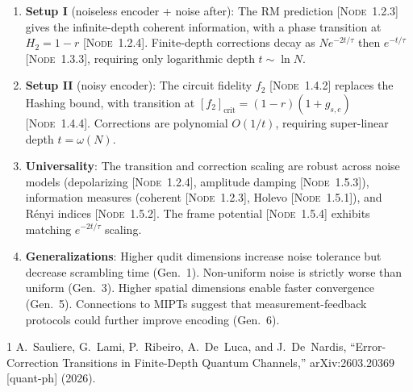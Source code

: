 \documentclass[11pt,a4paper]{article}
\newcommand{\noderef}[1]{\textsc{[Node~#1]}}
\begin{document}
\begin{enumerate}
    \item \textbf{Setup I} (noiseless encoder + noise after): The RM prediction \noderef{1.2.3} gives the infinite-depth coherent information, with a phase transition at $H_2 = 1-r$ \noderef{1.2.4}. Finite-depth corrections decay as $N e^{-2t/\tau}$ then $e^{-t/\tau}$ \noderef{1.3.3}, requiring only logarithmic depth $t \sim \ln N$.

    \item \textbf{Setup II} (noisy encoder): The circuit fidelity $f_2$ \noderef{1.4.2} replaces the Hashing bound, with transition at $[f_2]_{\mathrm{crit}} = (1-r)(1+g_{s,e})$ \noderef{1.4.4}. Corrections are polynomial $O(1/t)$, requiring super-linear depth $t = \omega(N)$.

    \item \textbf{Universality}: The transition and correction scaling are robust across noise models (depolarizing \noderef{1.2.4}, amplitude damping \noderef{1.5.3}), information measures (coherent \noderef{1.2.3}, Holevo \noderef{1.5.1}), and R\'enyi indices \noderef{1.5.2}. The frame potential \noderef{1.5.4} exhibits matching $e^{-2t/\tau}$ scaling.

    \item \textbf{Generalizations}: Higher qudit dimensions increase noise tolerance but decrease scrambling time (Gen.~1). Non-uniform noise is strictly worse than uniform (Gen.~3). Higher spatial dimensions enable faster convergence (Gen.~5). Connections to MIPTs suggest that measurement-feedback protocols could further improve encoding (Gen.~6).
\end{enumerate}

\begin{thebibliography}{1}
A.~Sauliere, G.~Lami, P.~Ribeiro, A.~De~Luca, and J.~De~Nardis,
``Error-Correction Transitions in Finite-Depth Quantum Channels,''
arXiv:2603.20369 [quant-ph] (2026).
\end{thebibliography}
\end{document}
